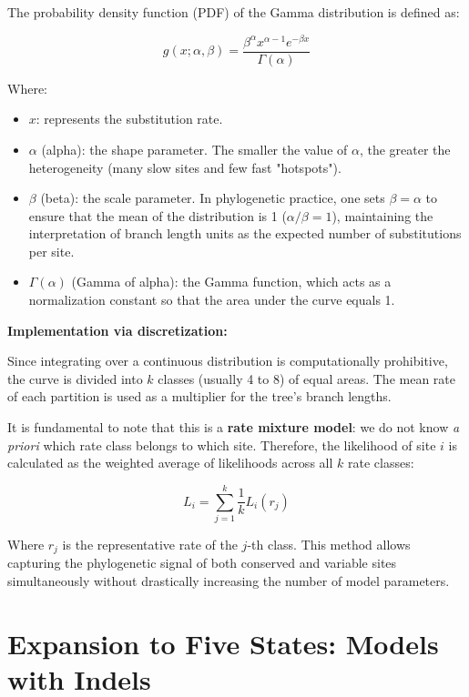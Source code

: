 The probability density function (PDF) of the Gamma distribution is defined as:

\begin{equation}
g(x; \alpha, \beta) = \frac{\beta^{\alpha} x^{\alpha-1} e^{-\beta x}}{\Gamma(\alpha)}
\end{equation}

Where:
\begin{itemize}
    \item $x$: represents the substitution rate.
    \item $\alpha$ (alpha): the shape parameter. The smaller the value of $\alpha$, the greater the heterogeneity (many slow sites and few fast "hotspots").
    \item $\beta$ (beta): the scale parameter. In phylogenetic practice, one sets $\beta = \alpha$ to ensure that the mean of the distribution is 1 ($\alpha/\beta = 1$), maintaining the interpretation of branch length units as the expected number of substitutions per site.
    \item $\Gamma(\alpha)$ (Gamma of alpha): the Gamma function, which acts as a normalization constant so that the area under the curve equals 1.
\end{itemize}

\textbf{Implementation via discretization:}

Since integrating over a continuous distribution is computationally prohibitive, the curve is divided into $k$ classes (usually 4 to 8) of equal areas. The mean rate of each partition is used as a multiplier for the tree's branch lengths.

It is fundamental to note that this is a \textbf{rate mixture model}: we do not know \textit{a priori} which rate class belongs to which site. Therefore, the likelihood of site $i$ is calculated as the weighted average of likelihoods across all $k$ rate classes:

\begin{equation}
L_i = \sum_{j=1}^{k} \frac{1}{k} L_i(r_j)
\end{equation}

Where $r_j$ is the representative rate of the $j$-th class. This method allows capturing the phylogenetic signal of both conserved and variable sites simultaneously without drastically increasing the number of model parameters.



\section{Expansion to Five States: Models with Indels}

